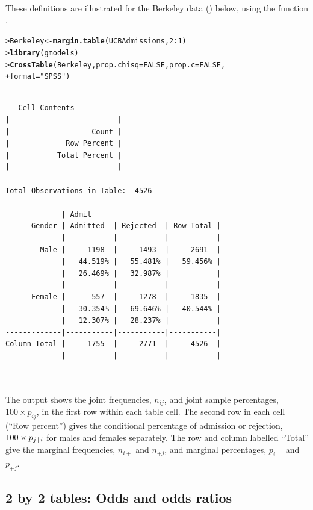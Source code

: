 \documentclass[10pt,krantz2]{krantz}\usepackage[]{graphicx}\usepackage[]{color}
\makeatletter
\newcommand{\hlnum}[1]{\textcolor[rgb]{0.686,0.059,0.569}{#1}}%
\newcommand{\hlstr}[1]{\textcolor[rgb]{0.192,0.494,0.8}{#1}}%
\newcommand{\hlopt}[1]{\textcolor[rgb]{0,0,0}{#1}}%
\newcommand{\hlstd}[1]{\textcolor[rgb]{0.345,0.345,0.345}{#1}}%
\newcommand{\hlkwb}[1]{\textcolor[rgb]{0.69,0.353,0.396}{#1}}%
\newcommand{\hlkwc}[1]{\textcolor[rgb]{0.333,0.667,0.333}{#1}}%
\newcommand{\hlkwd}[1]{\textcolor[rgb]{0.737,0.353,0.396}{\textbf{#1}}}%
\newenvironment{kframe}{%
 \def\at@end@of@kframe{}%
 \ifinner\ifhmode%
  \def\at@end@of@kframe{\end{minipage}}%
  \begin{minipage}{\columnwidth}%
 \fi\fi%
 \def\FrameCommand##1{\hskip\@totalleftmargin \hskip-\fboxsep
 \colorbox{shadecolor}{##1}\hskip-\fboxsep
     \hskip-\linewidth \hskip-\@totalleftmargin \hskip\columnwidth}%
 \MakeFramed {\advance\hsize-\width
   \@totalleftmargin\z@ \linewidth\hsize
   \@setminipage}}%
 {\par\unskip\endMakeFramed%
 \at@end@of@kframe}
\newenvironment{knitrout}{}{} %
\renewenvironment{knitrout}{\small\renewcommand{\baselinestretch}{.85}}{} %
\makeatother
\begin{document}
These definitions are illustrated
for the Berkeley data () below,
using the function .
\begin{knitrout}
\color{fgcolor}\begin{kframe}
\begin{alltt}
\hlstd{> }\hlstd{Berkeley} \hlkwb{<-} \hlkwd{margin.table}\hlstd{(UCBAdmissions,} \hlnum{2}\hlopt{:}\hlnum{1}\hlstd{)}
\hlstd{> }\hlkwd{library}\hlstd{(gmodels)}
\hlstd{> }\hlkwd{CrossTable}\hlstd{(Berkeley,} \hlkwc{prop.chisq} \hlstd{=} \hlnum{FALSE}\hlstd{,} \hlkwc{prop.c} \hlstd{=} \hlnum{FALSE}\hlstd{,}
\hlstd{+ }           \hlkwc{format} \hlstd{=} \hlstr{"SPSS"}\hlstd{)}
\end{alltt}
\begin{verbatim}

   Cell Contents
|-------------------------|
|                   Count |
|             Row Percent |
|           Total Percent |
|-------------------------|

Total Observations in Table:  4526 

             | Admit 
      Gender | Admitted  | Rejected  | Row Total | 
-------------|-----------|-----------|-----------|
        Male |     1198  |     1493  |     2691  | 
             |   44.519% |   55.481% |   59.456% | 
             |   26.469% |   32.987% |           | 
-------------|-----------|-----------|-----------|
      Female |      557  |     1278  |     1835  | 
             |   30.354% |   69.646% |   40.544% | 
             |   12.307% |   28.237% |           | 
-------------|-----------|-----------|-----------|
Column Total |     1755  |     2771  |     4526  | 
-------------|-----------|-----------|-----------|

 
\end{verbatim}
\end{kframe}
\end{knitrout}
The output shows the joint frequencies, $n_{ij}$, and joint sample percentages,
$100 \times p_{ij}$, in the first row within each table cell.
The second row in each cell (``Row percent'')
gives the conditional percentage of admission or rejection,
$100 \times p_{j\, | \, i}$ for males and females separately.
The row and column labelled ``Total'' give the
marginal frequencies, $n_{i+}$ and $n_{+j}$,
and marginal percentages, $p_{i+}$ and $p_{+j}$.


\subsection{2 by 2 tables: Odds and odds ratios}\label{sec:twoway-twobytwo}
\end{document}
